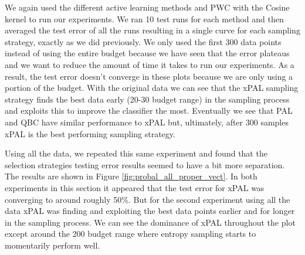We again used the different active learning methods and PWC with the Cosine kernel to run our experiments. We ran 10 test runs for each method and then averaged the test error of all the runs resulting in a single curve for each sampling strategy, exactly as we did previously. We only used the first 300 data points instead of using the entire budget because we have seen that the error plateaus and we want to reduce the amount of time it takes to run our experiments. As a result, the test error doesn't converge in these plots because we are only using a portion of the budget. With the original data we can see that the xPAL sampling strategy finds the best data early (20-30 budget range) in the sampling process and exploits this to improve the classifier the most. Eventually we see that PAL and QBC have similar performance to xPAL but, ultimately, after 300 samples xPAL is the best performing sampling strategy.

Using all the data, we repeated this same experiment and found that the selection strategies testing error results seemed to have a bit more separation. The results are shown in Figure \ref{fig:probal_all_proper_vect}. In both experiments in this section it appeared that the test error for xPAL was converging to around roughly 50\%. But for the second experiment using all the data xPAL was finding and exploiting the best data points earlier and for longer in the sampling process. We can see the dominance of xPAL throughout the plot except around the 200 budget range where entropy sampling starts to momentarily perform well.

